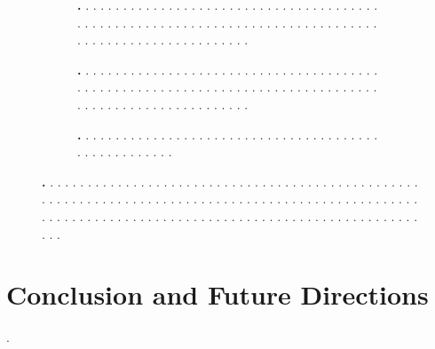 \documentclass[letterpaper,10pt,conference,twoside]{IEEEtran}
\theoremstyle{definition}
\begin{document}
\begin{figure}[t!]
  \centering
  \vspace*{-.3cm}
  \begin{subfigure}[t]{\linewidth}
  \hspace*{-.15cm}
  \caption{\textbf{.   }.   .   .   .   .   .   .   .   .   .   .   .   .   .   .   .   .   .   .   .   .   .   .   .   .   .   .   .   .   .   .   .   .   .   .   .   .   .   .   .   .   .   .   .   .   .   .   .   .   .   .   .   .   .   .   .   .   .   .   .   .   .   .   .   .   .   .   .   .   .   .   .   .   .   .   .   .   .   .   .   .   .   .   .   .   .   .   .   .   .   .   .   .   .   .   .   .   .   .   .   .   .}
  \end{subfigure}
  \begin{subfigure}[t]{\linewidth}
  \hspace*{-.15cm}
  \caption{\textbf{.   }.   .   .   .   .   .   .   .   .   .   .   .   .   .   .   .   .   .   .   .   .   .   .   .   .   .   .   .   .   .   .   .   .   .   .   .   .   .   .   .   .   .   .   .   .   .   .   .   .   .   .   .   .   .   .   .   .   .   .   .   .   .   .   .   .   .   .   .   .   .   .   .   .   .   .   .   .   .   .   .   .   .   .   .   .   .   .   .   .   .   .   .   .   .   .   .   .   .   .   .   .   .}
  \end{subfigure}
  \begin{subfigure}[t]{\linewidth}
  \hspace*{-.15cm}
  \caption{\textbf{.   }.   .   .   .   .   .   .   .   .   .   .   .   .   .   .   .   .   .   .   .   .   .   .   .   .   .   .   .   .   .   .   .   .   .   .   .   .   .   .   .   .   .   .   .   .   .   .   .   .   .   .   .}
  \end{subfigure}
  \caption[.]{\textbf{.   }.   .   .   .   .   .   .   .   .   .   .   .   .   .   .   .   .   .   .   .   .   .   .   .   .   .   .   .   .   .   .   .   .   .   .   .   .   .   .   .   .   .   .   .   .   .   .   .   .   .   .   .   .   .   .   .   .   .   .   .   .   .   .   .   .   .   .   .   .   .   .   .   .   .   .   .   .   .   .   .   .   .   .   .   .   .   .   .   .   .   .   .   .   .   .   .   .   .   .   .   .   .   .   .   .   .   .   .   .   .   .   .   .   .   .   .   .   .   .   .   .   .   .   .   .   .   .   .   .   .   .   .   .   .   .   .   .   .   .   .   .   .   .   .   .   .   .   .   .   .   .   .}
  \label{fig:1}
\end{figure}




\section{Conclusion and Future Directions}\label{sec:conc}
\noindent
.

{\small
 

}
\end{document}
